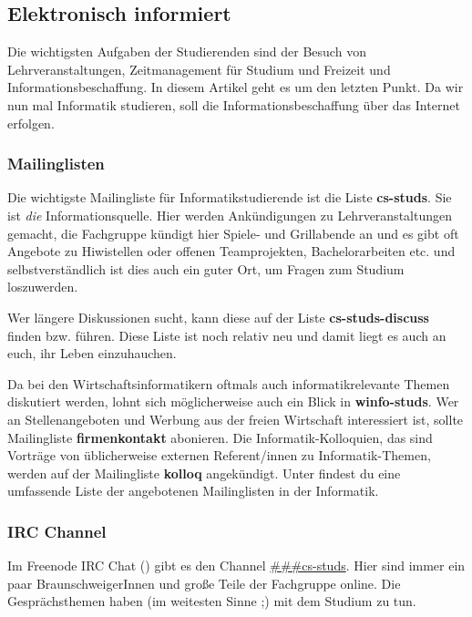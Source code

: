 
\subsection{Elektronisch informiert}
	\label{elekinf}
	Die wichtigsten Aufgaben der Studierenden sind der Besuch von Lehrveranstaltungen, Zeitmanagement für Studium und Freizeit und Informationsbeschaffung. In diesem Artikel geht es um den letzten Punkt. Da wir nun mal Informatik studieren, soll die Informationsbeschaffung über das Internet erfolgen.

	\subsubsection*{Mailinglisten}
	\label{mailinglisten}
		Die wichtigste Mailingliste für Informatikstudierende ist die Liste \textbf{cs-studs}. Sie ist \emph{die} Informationsquelle. Hier werden Ankündigungen zu Lehrveranstaltungen gemacht, die Fachgruppe kündigt hier Spiele- und Grillabende an und es gibt oft Angebote zu Hiwistellen oder offenen Teamprojekten, Bachelorarbeiten etc. und selbstverständlich ist dies auch ein guter Ort, um Fragen zum Studium loszuwerden.

		Wer längere Diskussionen sucht, kann diese auf der Liste \textbf{cs-studs-discuss} finden bzw. führen. Diese Liste ist noch relativ neu und damit liegt es auch an euch, ihr Leben einzuhauchen.

		Da bei den Wirtschaftsinformatikern oftmals auch informatikrelevante Themen diskutiert werden, lohnt sich möglicherweise auch ein Blick in \textbf{winfo-studs}. 
		Wer an Stellenangeboten und Werbung aus der freien
		Wirtschaft interessiert ist, sollte Mailingliste
		\textbf{firmenkontakt} abonieren. Die
		Informatik-Kolloquien, das sind Vorträge von
		üblicherweise externen Referent/innen zu Informatik-Themen,
		werden auf der Mailingliste \textbf{kolloq} angekündigt.
		Unter
		findest du eine umfassende Liste der angebotenen Mailinglisten in der Informatik.

	\subsubsection*{IRC Channel}
		Im Freenode IRC Chat () gibt es den Channel \url{###cs-studs}. Hier sind immer ein paar BraunschweigerInnen und große Teile der Fachgruppe online. Die Gesprächsthemen haben (im weitesten Sinne ;) mit dem Studium zu tun.


